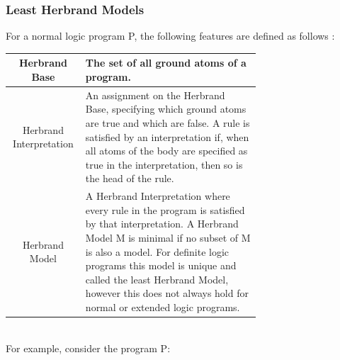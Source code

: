 \pagebreak

\subsubsection{Least Herbrand Models}
For a normal logic program P, the following features are defined as follows \cite{KRnotes} :

\begin{center}
\begin{tabular}{| c | m{0.7\linewidth} |}
\hline
Herbrand Base & 
\mbox{}\newline
The set of all ground atoms of a program.\newline
\\
\hline
Herbrand Interpretation & 
\mbox{}\newline
An assignment on the Herbrand Base, specifying which ground atoms are true and which are false.\newline \newline
A rule is satisfied by an interpretation if, when all atoms of the body are specified as true in the interpretation, then so is the head of the rule.\newline
\\
\hline
Herbrand Model & 
\mbox{}\newline
A Herbrand Interpretation where every rule in the program is satisfied by that interpretation.\newline \newline
A Herbrand Model M is minimal if no subset of M is also a model. For definite logic programs this model is unique and called the least Herbrand Model, however this does not always hold for normal or extended logic programs.\newline
\\
\hline
\end{tabular}
\end{center}
\mbox{}\\
For example, consider the program P:\\

